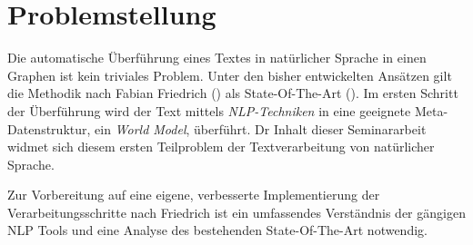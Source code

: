 \section{Problemstellung}

Die automatische Überführung eines Textes in natürlicher Sprache in einen Graphen ist kein triviales Problem. Unter den bisher entwickelten Ansätzen gilt die Methodik nach Fabian Friedrich (\cite[vgl.][]{FRIEDRICH1}) als State-Of-The-Art (\cite[vgl.][]{RIEFER}). Im ersten Schritt der Überführung wird der Text mittels \textit{\ac{NLP}-Techniken} in eine geeignete Meta-Datenstruktur, ein \textit{World Model}, überführt. Dr Inhalt dieser Seminararbeit widmet sich diesem ersten Teilproblem der Textverarbeitung von natürlicher Sprache.
\par
Zur Vorbereitung auf eine eigene, verbesserte Implementierung der Verarbeitungsschritte nach Friedrich ist ein umfassendes Verständnis der gängigen \ac{NLP} Tools und eine Analyse des bestehenden State-Of-The-Art notwendig.



 